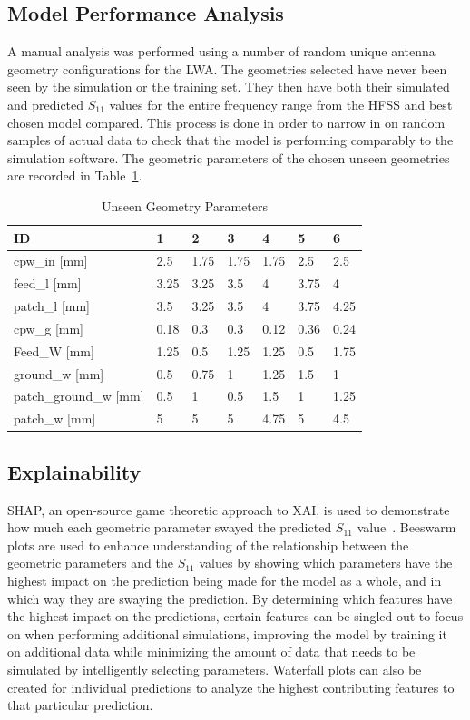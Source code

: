 \documentclass[conference]{IEEEtran}
\begin{document}
\subsection{Model Performance Analysis}
A manual analysis was performed using a number of random unique antenna geometry configurations for the LWA. The geometries selected have never been seen by the simulation or the training set. They then have both their simulated and predicted $S_{11}$ values for the entire frequency range from the HFSS and best chosen model compared. This process is done in order to narrow in on random samples of actual data to check that the model is performing comparably to the simulation software. The geometric parameters of the chosen unseen geometries are recorded in Table~\ref{unseen_geometries}.

\begin{table}[h]
\caption{Unseen Geometry Parameters}
\begin{center}
\begin{tabular}{ |l|l|l|l|l|l|l| }
    \hline
    ID & 1 & 2 & 3 & 4 & 5 & 6 \\
    \hline
    cpw\_in [mm] & 2.5 & 1.75 & 1.75 & 1.75 & 2.5 & 2.5 \\
    \hline
    feed\_l [mm] & 3.25 & 3.25 & 3.5 & 4 & 3.75 & 4 \\
    \hline
    patch\_l [mm] & 3.5 & 3.25 & 3.5 & 4 & 3.75 & 4.25 \\
    \hline
    cpw\_g [mm] & 0.18 & 0.3 & 0.3 & 0.12 & 0.36 & 0.24 \\
    \hline
    Feed\_W [mm] & 1.25 & 0.5 & 1.25 & 1.25 & 0.5 & 1.75 \\
    \hline
    ground\_w [mm] & 0.5 & 0.75 & 1 & 1.25 & 1.5 & 1 \\
    \hline
    patch\_ground\_w [mm] & 0.5 & 1 & 0.5 & 1.5 & 1 & 1.25 \\
    \hline
    patch\_w [mm] & 5 & 5 & 5 & 4.75 & 5 & 4.5 \\
    \hline
\end{tabular}
\end{center}
\label{unseen_geometries}
\end{table}    


\subsection{Explainability}
SHAP, an open-source game theoretic approach to XAI, is used to demonstrate how much each geometric parameter swayed the predicted $S_{11}$ value~\cite{NIPS2017_7062}. Beeswarm plots are used to enhance understanding of the relationship between the geometric parameters and the $S_{11}$ values by showing which parameters have the highest impact on the prediction being made for the model as a whole, and in which way they are swaying the prediction. By determining which features have the highest impact on the predictions, certain features can be singled out to focus on when performing additional simulations, improving the model by training it on additional data while minimizing the amount of data that needs to be simulated by intelligently selecting parameters. Waterfall plots can also be created for individual predictions to analyze the highest contributing features to that particular prediction.
\end{document}
